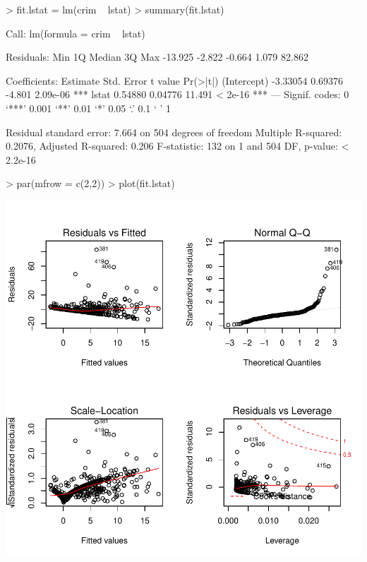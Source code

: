 \documentclass[a4paper]{article}
\begin{document}
\begin{Schunk}
\begin{Sinput}
> fit.lstat = lm(crim ~ lstat)
> summary(fit.lstat)
\end{Sinput}
\begin{Soutput}
Call:
lm(formula = crim ~ lstat)

Residuals:
    Min      1Q  Median      3Q     Max 
-13.925  -2.822  -0.664   1.079  82.862 

Coefficients:
            Estimate Std. Error t value Pr(>|t|)    
(Intercept) -3.33054    0.69376  -4.801 2.09e-06 ***
lstat        0.54880    0.04776  11.491  < 2e-16 ***
---
Signif. codes:  0 ‘***’ 0.001 ‘**’ 0.01 ‘*’ 0.05 ‘.’ 0.1 ‘ ’ 1

Residual standard error: 7.664 on 504 degrees of freedom
Multiple R-squared:  0.2076,	Adjusted R-squared:  0.206 
F-statistic:   132 on 1 and 504 DF,  p-value: < 2.2e-16
\end{Soutput}
\begin{Sinput}
> par(mfrow = c(2,2))
> plot(fit.lstat)
\end{Sinput}
\end{Schunk}
\includegraphics{mutivariblelm-lstat}
\end{document}
